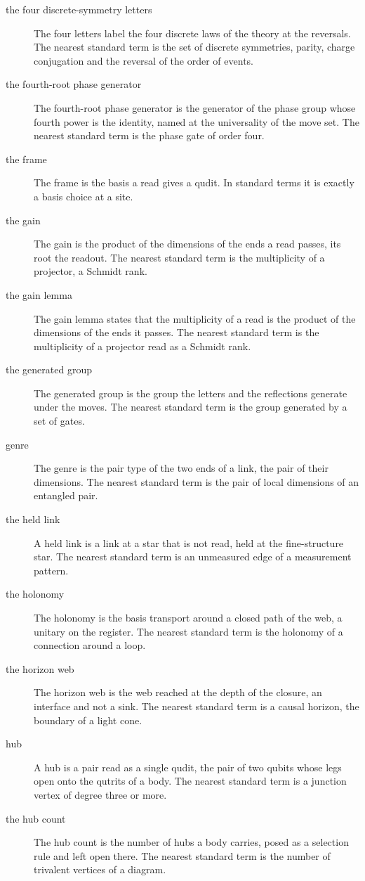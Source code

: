 \begin{description}
\item[the four discrete-symmetry letters] The four letters label the four discrete laws of the theory at the reversals. The nearest standard term is the set of discrete symmetries, parity, charge conjugation and the reversal of the order of events.
\item[the fourth-root phase generator] The fourth-root phase generator is the generator of the phase group whose fourth power is the identity, named at the universality of the move set. The nearest standard term is the phase gate of order four.
\item[the frame] The frame is the basis a read gives a qudit. In standard terms it is exactly a basis choice at a site.
\item[the gain] The gain is the product of the dimensions of the ends a read passes, its root the readout. The nearest standard term is the multiplicity of a projector, a Schmidt rank.
\item[the gain lemma] The gain lemma states that the multiplicity of a read is the product of the dimensions of the ends it passes. The nearest standard term is the multiplicity of a projector read as a Schmidt rank.
\item[the generated group] The generated group is the group the letters and the reflections generate under the moves. The nearest standard term is the group generated by a set of gates.
\item[genre] The genre is the pair type of the two ends of a link, the pair of their dimensions. The nearest standard term is the pair of local dimensions of an entangled pair.
\item[the held link] A held link is a link at a star that is not read, held at the fine-structure star. The nearest standard term is an unmeasured edge of a measurement pattern.
\item[the holonomy] The holonomy is the basis transport around a closed path of the web, a unitary on the register. The nearest standard term is the holonomy of a connection around a loop.
\item[the horizon web] The horizon web is the web reached at the depth of the closure, an interface and not a sink. The nearest standard term is a causal horizon, the boundary of a light cone.
\item[hub] A hub is a pair read as a single qudit, the pair of two qubits whose legs open onto the qutrits of a body. The nearest standard term is a junction vertex of degree three or more.
\item[the hub count] The hub count is the number of hubs a body carries, posed as a selection rule and left open there. The nearest standard term is the number of trivalent vertices of a diagram.

\end{description}
